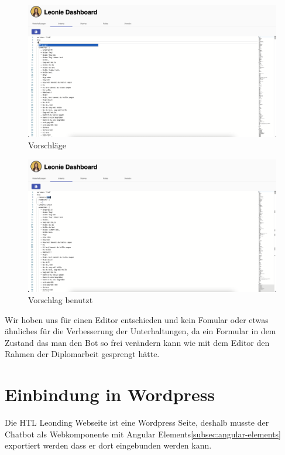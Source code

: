 \begin{figure}[hbt!]
    \centering
    \includegraphics[scale=0.2]{pics/dashboardCodeSuggestion}
    \caption{Vorschläge}
    \label{fig:impl:dashboardCodeSuggestion}
\end{figure}
\begin{figure}[hbt!]
    \centering
    \includegraphics[scale=0.2]{pics/dashboardSuggestionMade}
    \caption{Vorschlag benutzt}
    \label{fig:impl:dashboardCodeSuggestionMade}
\end{figure}

Wir hoben uns für einen Editor entschieden und kein Fomular oder etwas ähnliches für die Verbesserung der Unterhaltungen, da ein Formular in dem Zustand das man den Bot so frei verändern kann wie mit dem Editor den Rahmen der Diplomarbeit gesprengt hätte.

\section{Einbindung in Wordpress}
Die HTL Leonding Webseite ist eine Wordpress Seite, deshalb musste der Chatbot als Webkomponente mit Angular Elements\ref{subsec:angular-elements} exportiert werden dass er dort eingebunden werden kann.

